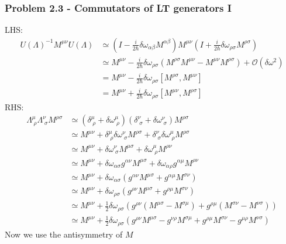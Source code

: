 \documentclass[10pt,a4paper]{book}
\theoremstyle{definition}
\begin{document}
\subsubsection{Problem 2.3 - Commutators of LT generators I}
LHS:
\begin{align}
U(\Lambda)^{-1}M^{\mu\nu}U(\Lambda)
&\simeq\left(I-\frac{i}{2\hbar}\delta\omega_{\alpha\beta}M^{\alpha\beta}\right)M^{\mu\nu}\left(I+\frac{i}{2\hbar}\delta\omega_{\rho\sigma}M^{\rho\sigma}\right)\\
&\simeq M^{\mu\nu}-\frac{i}{2\hbar}\delta\omega_{\rho\sigma}(M^{\rho\sigma}M^{\mu\nu}-M^{\mu\nu}M^{\rho\sigma})+\mathcal{O}(\delta\omega^2)\\
&= M^{\mu\nu}-\frac{i}{2\hbar}\delta\omega_{\rho\sigma}[M^{\rho\sigma},M^{\mu\nu}]\\
&= M^{\mu\nu}+\frac{i}{2\hbar}\delta\omega_{\rho\sigma}[M^{\mu\nu},M^{\rho\sigma}]
\end{align}
RHS:
\begin{align}
\Lambda^{\mu}_{\;\rho}\Lambda^\nu_{\;\sigma}M^{\rho\sigma}
&\simeq\left(\delta^{\mu}_{\;\rho}+\delta\omega^{\mu}_{\;\rho}\right)\left(\delta^{\nu}_{\;\sigma}+\delta\omega^{\nu}_{\;\sigma}\right)M^{\rho\sigma}\\
&\simeq M^{\mu\nu}+\delta^\mu_{\;\rho}\delta\omega^\nu_{\;\sigma}M^{\rho\sigma}+\delta^\nu_{\;\sigma}\delta\omega^\mu_{\;\rho}M^{\rho\sigma}\\
&\simeq M^{\mu\nu}+\delta\omega^\nu_{\;\sigma}M^{\mu\sigma}+\delta\omega^\mu_{\;\rho}M^{\rho\nu}\\
&\simeq M^{\mu\nu}+\delta\omega_{\alpha\sigma}g^{\alpha\nu}M^{\mu\sigma}+\delta\omega_{\alpha\rho}g^{\alpha\mu}M^{\rho\nu}\\
&\simeq M^{\mu\nu}+\delta\omega_{\alpha\sigma}(g^{\alpha\nu}M^{\mu\sigma}+g^{\alpha\mu}M^{\sigma\nu})\\
&\simeq M^{\mu\nu}+\delta\omega_{\rho\sigma}(g^{\rho\nu}M^{\mu\sigma}+g^{\rho\mu}M^{\sigma\nu})\\
&\simeq M^{\mu\nu}+\frac{1}{2}\delta\omega_{\rho\sigma}\left(g^{\rho\nu}(M^{\mu\sigma}-M^{\sigma\mu})+g^{\rho\mu}(M^{\sigma\nu}-M^{\nu\sigma})\right)\\
&\simeq M^{\mu\nu}+\frac{1}{2}\delta\omega_{\rho\sigma}\left(g^{\rho\nu}M^{\mu\sigma}-g^{\nu\rho}M^{\sigma\mu}+g^{\rho\mu}M^{\sigma\nu}-g^{\mu\rho}M^{\nu\sigma}\right)
\end{align}
Now we use the antisymmetry of $M$ 
\end{document}
